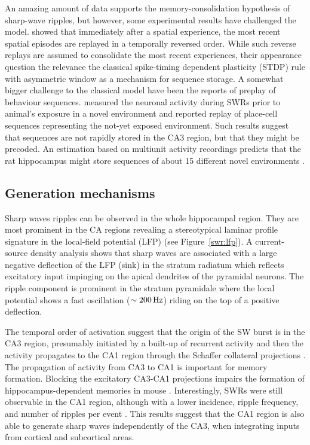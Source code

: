     An amazing amount of data supports the memory-consolidation hypothesis of
    sharp-wave ripples, but however, some experimental results have challenged
    the model. \cite{Foster2006} showed that immediately after a spatial
    experience, the most recent spatial episodes are replayed in a temporally
    reversed order. While such reverse replays are assumed to consolidate the
    most recent experiences, their appearance question the relevance the
    classical spike-timing dependent plasticity (STDP) rule with asymmetric
    window \citep{Bi98} as a mechanism for sequence storage. A somewhat bigger
    challenge to the classical model have been the reports of preplay of
    behaviour sequences. \cite{Dragoi2011} measured the neuronal activity
    during SWRs prior to animal's exposure in a novel environment and reported
    replay of place-cell sequences representing the not-yet exposed
    environment. Such results suggest that sequences are not rapidly stored in
    the CA3 region, but that they might be precoded. An estimation based on multiunit
    activity recordings predicts that the rat hippocampus might store sequences
    of about 15 different novel environments \citep{Dragoi2013}.
    
  \subsection{Generation mechanisms}
    Sharp waves ripples can be observed in the whole hippocampal region. They
    are most prominent in the CA regions revealing a stereotypical laminar
    profile signature in the local-field potential (LFP) (see
    Figure~\ref{swr:lfp}). A current-source density analysis shows that sharp
    waves are associated with a large negative deflection of the LFP (sink) in
    the stratum radiatum which reflects excitatory input impinging on the
    apical dendrites of the pyramidal neurons. The ripple component is
    prominent in the stratum pyramidale where the local potential shows a fast
    oscillation ($\sim200\rm \, Hz$) riding on the top of a positive
    deflection.

    The temporal order of activation suggest that the origin of the SW burst is
    in the CA3 region, presumably initiated by a built-up of recurrent activity
    \citep{delaPrida2006,schilglof?} and then the activity propagates to the
    CA1 region through the Schaffer collateral projections
    \citep{Csicsvari2000}. The propagation of activity from CA3 to CA1 is
    important for memory formation.  Blocking the excitatory CA3-CA1
    projections impairs the formation of hippocampus-dependent memories in
    mouse \citep{Nakashiba2008}. Interestingly, SWRs were still observable in
    the CA1 region, although with a lower incidence, ripple frequency, and
    number of ripples per event \citep{Nakashiba2009}. This results suggest
    that the CA1 region is also able to generate sharp waves independently of
    the CA3, when integrating inputs from cortical and subcortical areas.

